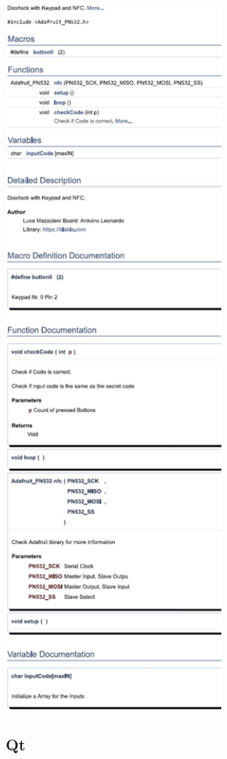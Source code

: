 \begin{multicols}{2}
		
	\includegraphics[width=8cm]{images/html.JPG}
\end{multicols}	
\pagebreak

\subsection{Qt}
